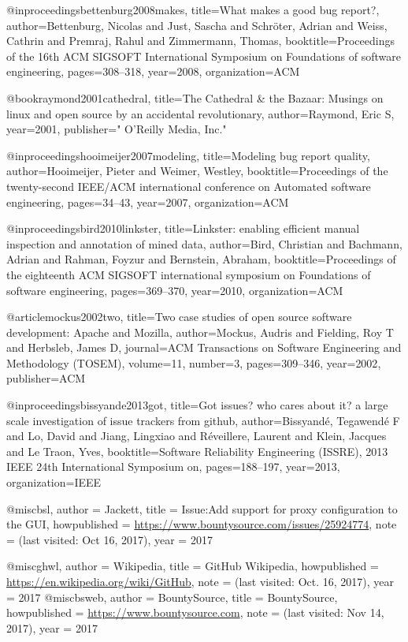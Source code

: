 
@inproceedings{bettenburg2008makes,
  title={What makes a good bug report?},
  author={Bettenburg, Nicolas and Just, Sascha and Schr{\"o}ter, Adrian and Weiss, Cathrin and Premraj, Rahul and Zimmermann, Thomas},
  booktitle={Proceedings of the 16th ACM SIGSOFT International Symposium on Foundations of software engineering},
  pages={308--318},
  year={2008},
  organization={ACM}
}

@book{raymond2001cathedral,
  title={The Cathedral \& the Bazaar: Musings on linux and open source by an accidental revolutionary},
  author={Raymond, Eric S},
  year={2001},
  publisher={" O'Reilly Media, Inc."}
}

@inproceedings{hooimeijer2007modeling,
  title={Modeling bug report quality},
  author={Hooimeijer, Pieter and Weimer, Westley},
  booktitle={Proceedings of the twenty-second IEEE/ACM international conference on Automated software engineering},
  pages={34--43},
  year={2007},
  organization={ACM}
}


@inproceedings{bird2010linkster,
  title={Linkster: enabling efficient manual inspection and annotation of mined data},
  author={Bird, Christian and Bachmann, Adrian and Rahman, Foyzur and Bernstein, Abraham},
  booktitle={Proceedings of the eighteenth ACM SIGSOFT international symposium on Foundations of software engineering},
  pages={369--370},
  year={2010},
  organization={ACM}
}

@article{mockus2002two,
  title={Two case studies of open source software development: Apache and Mozilla},
  author={Mockus, Audris and Fielding, Roy T and Herbsleb, James D},
  journal={ACM Transactions on Software Engineering and Methodology (TOSEM)},
  volume={11},
  number={3},
  pages={309--346},
  year={2002},
  publisher={ACM}
}

@inproceedings{bissyande2013got,
  title={Got issues? who cares about it? a large scale investigation of issue trackers from github},
  author={Bissyand{\'e}, Tegawend{\'e} F and Lo, David and Jiang, Lingxiao and R{\'e}veillere, Laurent and Klein, Jacques and Le Traon, Yves},
  booktitle={Software Reliability Engineering (ISSRE), 2013 IEEE 24th International Symposium on},
  pages={188--197},
  year={2013},
  organization={IEEE}
}


@misc{bsl,
  author = {{Jackett}},
  title = {{Issue:Add support for proxy configuration to the GUI}},
  howpublished = {\url{https://www.bountysource.com/issues/25924774}},
  note = {(last visited: Oct 16, 2017)},
  year = {2017}
}

@misc{ghwl,
  author = {{Wikipedia}},
  title = {{GitHub Wikipedia}},
  howpublished = {\url{https://en.wikipedia.org/wiki/GitHub}},
  note = {(last visited: Oct. 16, 2017)},
  year = {2017}
}
@misc{bsweb,
  author = {{BountySource}},
  title = {{BountySource}},
  howpublished = {\url{https://www.bountysource.com}},
  note = {(last visited: Nov 14, 2017)},
  year = {2017}
}

